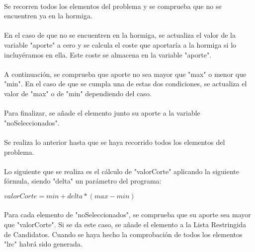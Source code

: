 	\paragraph{}Se recorren todos los elementos del problema y se comprueba que no se encuentren ya en la hormiga.
	
	\paragraph{}En el caso de que no se encuentren en la hormiga, se actualiza el valor de la variable "aporte" a cero y se calcula el coste que aportaría a la hormiga si lo incluyéramos en ella. Este coste se almacena en la variable "aporte".
	
	\paragraph{}A continuación, se comprueba que aporte no sea mayor que "max" o menor que "min". En el caso de que se cumpla una de estas dos condiciones, se actualiza el valor de "max" o de "min" dependiendo del caso.
	
	\paragraph{}Para finalizar, se añade el elemento junto su aporte a la variable "noSeleccionados".
	
	\paragraph{}Se realiza lo anterior hasta que se haya recorrido todos los elementos del problema.
	
	\paragraph{} Lo siguiente que se realiza es el cálculo de "valorCorte" aplicando la siguiente fórmula, siendo "delta" un parámetro del programa:
	
	\begin{center}
		$valorCorte = min + delta * ( max - min )$
	\end{center}
	
	\paragraph{}Para cada elemento de "noSeleccionados", se comprueba que su aporte sea mayor que "valorCorte". Si se da este caso, se añade el elemento a la Lista Restringida de Candidatos. Cuando se haya hecho la comprobación de todos los elementos "lrc" habrá sido generada.
	
